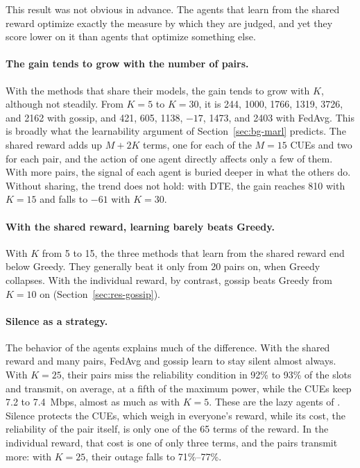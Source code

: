 This result was not obvious in advance. The agents that learn from the shared reward optimize exactly the
measure by which they are judged, and yet they score lower on it than agents that optimize something else.

\paragraph{The gain tends to grow with the number of pairs.} With the methods that share their models, the gain
tends to grow with $K$, although not steadily. From $K = 5$ to $K = 30$, it is 244, 1000, 1766, 1319, 3726, and
2162 with gossip, and 421, 605, 1138, $-17$, 1473, and 2403 with \ac{FedAvg}. This is broadly what the
learnability argument of Section~\ref{sec:bg-marl} predicts. The shared reward adds up $M + 2K$ terms, one for
each of the $M = 15$ \acp{CUE} and two for each pair, and the action of one agent directly affects only a few
of them. With more pairs, the signal of each agent is buried deeper in what the others do. Without sharing,
the trend does not hold: with \ac{DTE}, the gain reaches 810 with $K = 15$ and falls to $-61$ with $K = 30$.

\paragraph{With the shared reward, learning barely beats Greedy.} With $K$ from 5 to 15, the three methods
that learn from the shared reward end below Greedy. They generally beat it only from 20 pairs on, when Greedy
collapses. With the individual reward, by contrast, gossip beats Greedy from $K = 10$ on
(Section~\ref{sec:res-gossip}).

\paragraph{Silence as a strategy.} The behavior of the agents explains much of the difference. With the
shared reward and many pairs, \ac{FedAvg} and gossip learn to stay silent almost always. With $K = 25$, their
pairs miss the reliability condition in 92\% to 93\% of the slots and transmit, on average, at a fifth of the
maximum power, while the \acp{CUE} keep 7.2 to \SI{7.4}{Mbps}, almost as much as with $K = 5$. These are the
lazy agents of \citet{sunehag+18vdn}. Silence protects the \acp{CUE}, which weigh in everyone's reward, while
its cost, the reliability of the pair itself, is only one of the 65 terms of the reward. In the individual
reward, that cost is one of only three terms, and the pairs transmit more: with $K = 25$, their outage falls
to 71\%--77\%.

